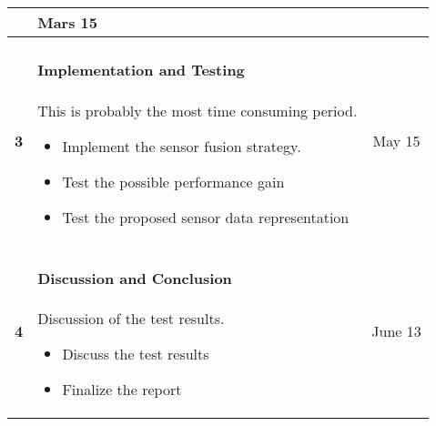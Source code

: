 \documentclass[a4paper, 10pt]{article}
\begin{document}
\begin{tabular}{| c | p{11.5cm} || c |}
                                                       & Mars 15 \\
        \hline
        \textbf{3}  &   \paragraph{Implementation and Testing} This is probably the most
                        time consuming period.
                        \begin{itemize}
                            \item Implement the sensor fusion strategy.
                            \item Test the possible performance gain
                            \item Test the proposed sensor data representation
                        \end{itemize}
                                                       & May 15 \\
        \hline
        \textbf{4}  &   \paragraph{Discussion and Conclusion} Discussion of the test
                        results. 
                        \begin{itemize}
                            \item Discuss the test results
                            \item Finalize the report
                        \end{itemize}
                                                       & June 13 \\

    \hline
\end{tabular}
\end{document}
